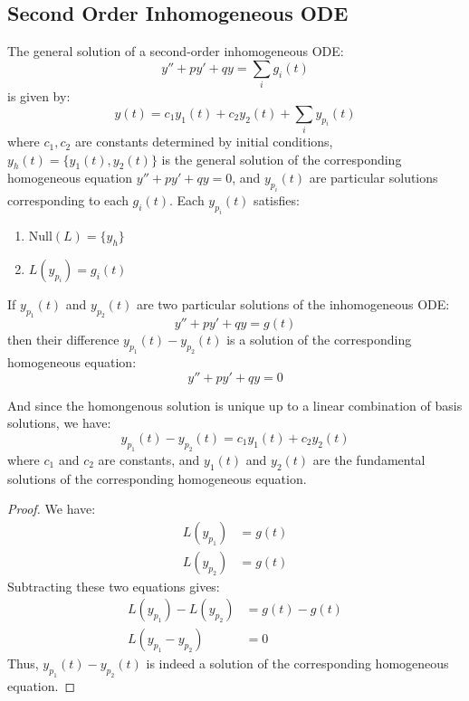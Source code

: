 \documentclass[11pt]{article}
\begin{document}
\subsection{Second Order Inhomogeneous ODE}
\begin{theorem}
    The general solution of a second-order inhomogeneous ODE:
    $$y'' + p y' + q y = \sum_i g_i(t)$$
    is given by:
    \begin{equation}
    y(t) = c_1 y_1(t) + c_2 y_2(t) + \sum_i y_{p_i}(t)
    \end{equation}
    where \(c_1, c_2\) are constants determined by initial conditions, \( y_h(t) = \{ y_1(t) , y_2(t) \} \) is the general solution of the corresponding homogeneous equation \( y'' + p y' + q y = 0 \), and \( y_{p_i}(t) \) are particular solutions corresponding to each \( g_i(t) \). Each \( y_{p_i}(t) \) satisfies:
    \begin{enumerate}
        \item $\text{Null}(L) = \{y_h\}$
        \item $L(y_{p_i}) = g_i(t)$
    \end{enumerate}
\end{theorem}
\begin{theorem}
    If \( y_{p_1}(t) \) and \( y_{p_2}(t) \) are two particular solutions of the inhomogeneous ODE:
    $$y'' + p y' + q y = g(t)$$
    then their difference \( y_{p_1}(t) - y_{p_2}(t) \) is a solution of the corresponding homogeneous equation:
    $$y'' + p y' + q y = 0$$

    And since the homongenous solution is unique up to a linear combination of basis solutions, we have:
    $$y_{p_1}(t) - y_{p_2}(t) = c_1 y_1(t) + c_2 y_2(t)$$
    where \( c_1 \) and \( c_2 \) are constants, and \( y_1(t) \) and \( y_2(t) \) are the fundamental solutions of the corresponding homogeneous equation.
\end{theorem}
\begin{proof}
    We have:
    \begin{align*}
        L(y_{p_1}) &= g(t) \\
        L(y_{p_2}) &= g(t)
    \end{align*}
    Subtracting these two equations gives:
    \begin{align*}
        L(y_{p_1}) - L(y_{p_2}) &= g(t) - g(t) \\
        L(y_{p_1} - y_{p_2}) &= 0
    \end{align*}
    Thus, \( y_{p_1}(t) - y_{p_2}(t) \) is indeed a solution of the corresponding homogeneous equation.
\end{proof}
\end{document}
